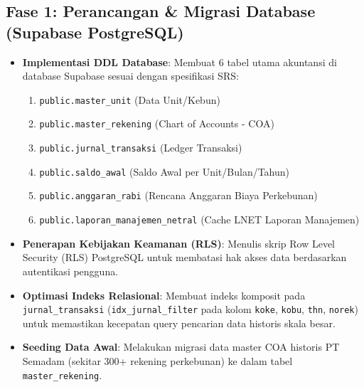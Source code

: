 \documentclass[11pt,a4paper]{article}
\begin{document}
\subsection{Fase 1: Perancangan \& Migrasi Database (Supabase PostgreSQL)}
\begin{itemize}
    \item \textbf{Implementasi DDL Database}: Membuat 6 tabel utama akuntansi di database Supabase sesuai dengan spesifikasi SRS:
    \begin{enumerate}
        \item \texttt{public.master\_unit} (Data Unit/Kebun)
        \item \texttt{public.master\_rekening} (Chart of Accounts - COA)
        \item \texttt{public.jurnal\_transaksi} (Ledger Transaksi)
        \item \texttt{public.saldo\_awal} (Saldo Awal per Unit/Bulan/Tahun)
        \item \texttt{public.anggaran\_rabi} (Rencana Anggaran Biaya Perkebunan)
        \item \texttt{public.laporan\_manajemen\_netral} (Cache LNET Laporan Manajemen)
    \end{enumerate}
    \item \textbf{Penerapan Kebijakan Keamanan (RLS)}: Menulis skrip Row Level Security (RLS) PostgreSQL untuk membatasi hak akses data berdasarkan autentikasi pengguna.
    \item \textbf{Optimasi Indeks Relasional}: Membuat indeks komposit pada \texttt{jurnal\_transaksi} (\texttt{idx\_jurnal\_filter} pada kolom \texttt{koke}, \texttt{kobu}, \texttt{thn}, \texttt{norek}) untuk memastikan kecepatan query pencarian data historis skala besar.
    \item \textbf{Seeding Data Awal}: Melakukan migrasi data master COA historis PT Semadam (sekitar 300+ rekening perkebunan) ke dalam tabel \texttt{master\_rekening}.
\end{itemize}
\end{document}
